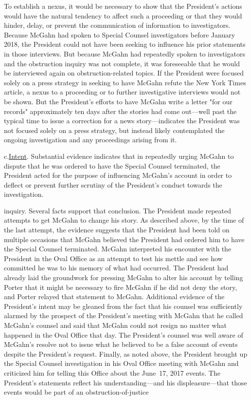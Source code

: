 To establish a nexus, it would be necessary to show that the President's actions would have the natural tendency to affect such a proceeding or that they would hinder, delay, or prevent the communication of information to investigators.
Because McGahn had spoken to Special Counsel investigators before January 2018, the President could not have been seeking to influence his prior statements in those interviews.
But because McGahn had repeatedly spoken to investigators and the obstruction inquiry was not complete, it was foreseeable that he would be interviewed again on obstruction-related topics.
If the President were focused solely on a press strategy in seeking to have McGahn refute the New York Times article, a nexus to a proceeding or to further investigative interviews would not be shown.
But the President's efforts to have McGahn write a letter "for our records" approximately ten days after the stories had come out---well past the typical time to issue a correction for a news story---indicates the President was not focused solely on a press strategy, but instead likely contemplated the ongoing investigation and any proceedings arising from it.

c.\qquad\underline{Intent}.
Substantial evidence indicates that in repeatedly urging McGahn to dispute that he was ordered to have the Special Counsel terminated, the President acted for the purpose of influencing McGahn's account in order to deflect or prevent further scrutiny of the President's conduct towards the investigation.

inquiry.
Several facts support that conclusion.
The President made repeated attempts to get McGahn to change his story.
As described above, by the time of the last attempt, the evidence suggests that the President had been told on multiple occasions that McGahn believed the President had ordered him to have the Special Counsel terminated.
McGahn interpreted his encounter with the President in the Oval Office as an attempt to test his mettle and see how committed he was to his memory of what had occurred.
The President had already laid the groundwork for pressing McGahn to alter his account by telling Porter that it might be necessary to fire McGahn if he did not deny the story, and Porter relayed that statement to McGahn.
Additional evidence of the President's intent may be gleaned from the fact that his counsel was sufficiently alarmed by the prospect of the President's meeting with McGahn that he called McGahn's counsel and said that McGahn could not resign no matter what happened in the Oval Office that day.
The President's counsel was well aware of McGahn's resolve not to issue what he believed to be a false account of events despite the President's request.
Finally, as noted above, the President brought up the Special Counsel investigation in his Oval Office meeting with McGahn and criticized him for telling this Office about the June~17, 2017 events.
The President's statements reflect his understanding---and his displeasure---that those events would be part of an obstruction-of-justice


